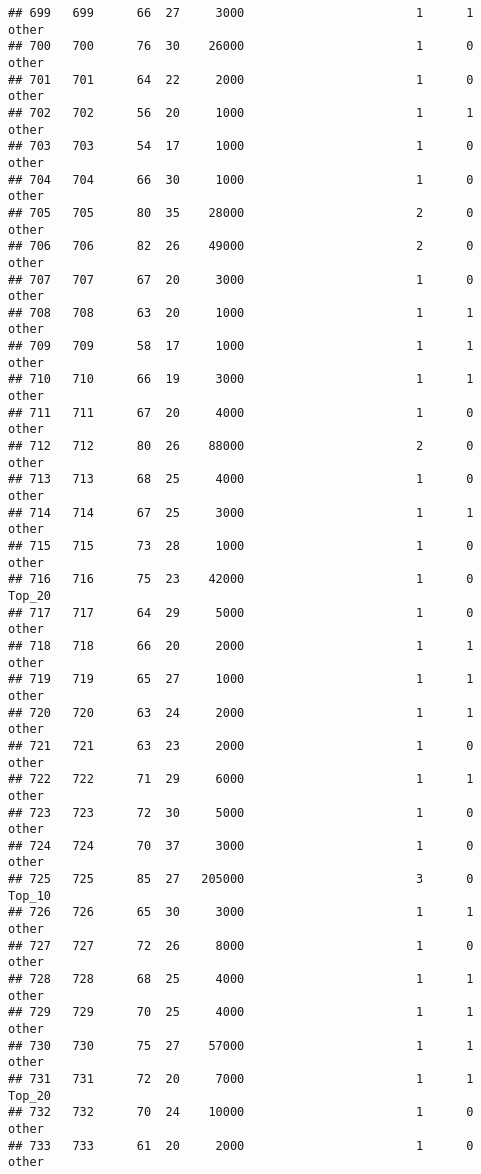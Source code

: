 \documentclass[
]{article}
\begin{document}
\begin{verbatim}
## 699   699      66  27     3000                        1      1    other
## 700   700      76  30    26000                        1      0    other
## 701   701      64  22     2000                        1      0    other
## 702   702      56  20     1000                        1      1    other
## 703   703      54  17     1000                        1      0    other
## 704   704      66  30     1000                        1      0    other
## 705   705      80  35    28000                        2      0    other
## 706   706      82  26    49000                        2      0    other
## 707   707      67  20     3000                        1      0    other
## 708   708      63  20     1000                        1      1    other
## 709   709      58  17     1000                        1      1    other
## 710   710      66  19     3000                        1      1    other
## 711   711      67  20     4000                        1      0    other
## 712   712      80  26    88000                        2      0    other
## 713   713      68  25     4000                        1      0    other
## 714   714      67  25     3000                        1      1    other
## 715   715      73  28     1000                        1      0    other
## 716   716      75  23    42000                        1      0   Top_20
## 717   717      64  29     5000                        1      0    other
## 718   718      66  20     2000                        1      1    other
## 719   719      65  27     1000                        1      1    other
## 720   720      63  24     2000                        1      1    other
## 721   721      63  23     2000                        1      0    other
## 722   722      71  29     6000                        1      1    other
## 723   723      72  30     5000                        1      0    other
## 724   724      70  37     3000                        1      0    other
## 725   725      85  27   205000                        3      0   Top_10
## 726   726      65  30     3000                        1      1    other
## 727   727      72  26     8000                        1      0    other
## 728   728      68  25     4000                        1      1    other
## 729   729      70  25     4000                        1      1    other
## 730   730      75  27    57000                        1      1    other
## 731   731      72  20     7000                        1      1   Top_20
## 732   732      70  24    10000                        1      0    other
## 733   733      61  20     2000                        1      0    other

\end{verbatim}
\end{document}
